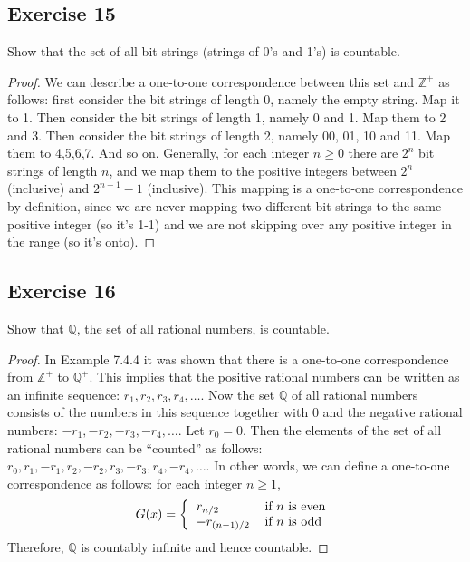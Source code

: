 \documentclass[14pt]{extarticle}
\newcommand{\Q}{\mathbb{Q}}
\newcommand{\Z}{\mathbb{Z}}
\begin{document}
\subsection{Exercise 15}
Show that the set of all bit strings (strings of 0’s and 1’s) is countable.

\begin{proof}
We can describe a one-to-one correspondence between this set and $\Z^+$ as follows: first consider the bit strings 
of length 0, namely the empty string. Map it to 1. Then consider the bit strings of length 1, namely 0 and 1. Map
them to 2 and 3. Then consider the bit strings of length 2, namely 00, 01, 10 and 11. Map them to 4,5,6,7. And so on.
Generally, for each integer \(n \geq 0\) there are \(2^n\) bit strings of length $n$, and we map them to the positive
integers between \(2^n\) (inclusive) and \(2^{n+1}-1\) (inclusive). This mapping is a one-to-one correspondence by
definition, since we are never mapping two different bit strings to the same positive integer (so it's 1-1) and we
are not skipping over any positive integer in the range (so it's onto).
\end{proof}

\subsection{Exercise 16}
Show that $\Q$, the set of all rational numbers, is countable.

\begin{proof}
In Example 7.4.4 it was shown that there is a one-to-one correspondence from $\Z^+$ to $\Q^+$. This implies that the 
positive rational numbers can be written as an infinite sequence: \(r_1, r_2, r_3, r_4, \ldots\). Now the set $\Q$ 
of all rational numbers consists of the numbers in this sequence together with 0 and the negative rational numbers: 
\(-r_1, -r_2, -r_3, -r_4, \ldots\). Let \(r_0 = 0\). Then the elements of the set of all rational numbers can be 
“counted” as follows: \(r_0, r_1, -r_1, r_2, -r_2, r_3, -r_ 3, r_4, -r_4, \ldots\). In other words, we can define a 
one-to-one correspondence as follows: for each integer \(n \geq 1\),
\[
G(x) =
\left\{
\begin{tabular}{ll}
\(r_{n/2}\) & if \(n\) is even \\
\(-r_{(n-1)/2}\) & if \(n\) is odd
\end{tabular}
\right.
\]
Therefore, $\Q$ is countably infinite and hence countable.
\end{proof}
\end{document}
